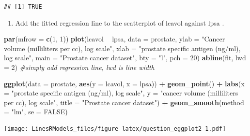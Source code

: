 \documentclass[]{book}
\newenvironment{Shaded}{\begin{snugshade}}{\end{snugshade}}
\newcommand{\KeywordTok}[1]{\textcolor[rgb]{0.13,0.29,0.53}{\textbf{#1}}}
\newcommand{\DataTypeTok}[1]{\textcolor[rgb]{0.13,0.29,0.53}{#1}}
\newcommand{\DecValTok}[1]{\textcolor[rgb]{0.00,0.00,0.81}{#1}}
\newcommand{\StringTok}[1]{\textcolor[rgb]{0.31,0.60,0.02}{#1}}
\newcommand{\CommentTok}[1]{\textcolor[rgb]{0.56,0.35,0.01}{\textit{#1}}}
\newcommand{\OtherTok}[1]{\textcolor[rgb]{0.56,0.35,0.01}{#1}}
\newcommand{\OperatorTok}[1]{\textcolor[rgb]{0.81,0.36,0.00}{\textbf{#1}}}
\newcommand{\NormalTok}[1]{#1}
\providecommand{\tightlist}{%
  \setlength{\itemsep}{0pt}\setlength{\parskip}{0pt}}
\theoremstyle{definition}
\theoremstyle{definition}
\theoremstyle{definition}
\theoremstyle{remark}
\begin{document}
\begin{verbatim}
## [1] TRUE
\end{verbatim}

\begin{enumerate}
\def\labelenumi{\alph{enumi}.}
\setcounter{enumi}{5}
\tightlist
\item
  Add the fitted regression line to the scatterplot of lcavol against
  lpsa .
\end{enumerate}

\begin{Shaded}
\begin{Highlighting}[]
\KeywordTok{par}\NormalTok{(}\DataTypeTok{mfrow =} \KeywordTok{c}\NormalTok{(}\DecValTok{1}\NormalTok{, }\DecValTok{1}\NormalTok{))}
\KeywordTok{plot}\NormalTok{(lcavol }\OperatorTok{~}\StringTok{ }\NormalTok{lpsa, }\DataTypeTok{data =}\NormalTok{ prostate,}
  \DataTypeTok{ylab =} \StringTok{"Cancer volume (milliliters per cc), log scale"}\NormalTok{,}
  \DataTypeTok{xlab =} \StringTok{"prostate specific antigen (ng/ml), log scale"}\NormalTok{, }
  \DataTypeTok{main =} \StringTok{"Prostate cancer dataset"}\NormalTok{,}
  \DataTypeTok{bty =} \StringTok{"l"}\NormalTok{, }\DataTypeTok{pch =} \DecValTok{20}\NormalTok{)}
\KeywordTok{abline}\NormalTok{(fit, }\DataTypeTok{lwd =} \DecValTok{2}\NormalTok{) }\CommentTok{#simply add regression line, lwd is line width}
\end{Highlighting}
\end{Shaded}

\begin{Shaded}
\begin{Highlighting}[]
\KeywordTok{ggplot}\NormalTok{(}\DataTypeTok{data =}\NormalTok{ prostate, }\KeywordTok{aes}\NormalTok{(}\DataTypeTok{y =}\NormalTok{ lcavol, }\DataTypeTok{x =}\NormalTok{ lpsa)) }\OperatorTok{+}\StringTok{ }
\StringTok{  }\KeywordTok{geom_point}\NormalTok{() }\OperatorTok{+}
\StringTok{  }\KeywordTok{labs}\NormalTok{(}\DataTypeTok{x =} \StringTok{"prostate specific antigen (ng/ml), log scale"}\NormalTok{,}
       \DataTypeTok{y =} \StringTok{"cancer volume (milliliters per cc), log scale"}\NormalTok{,}
       \DataTypeTok{title =} \StringTok{"Prostate cancer dataset"}\NormalTok{) }\OperatorTok{+}\StringTok{ }
\StringTok{  }\KeywordTok{geom_smooth}\NormalTok{(}\DataTypeTok{method =} \StringTok{"lm"}\NormalTok{, }\DataTypeTok{se =} \OtherTok{FALSE}\NormalTok{)}
\end{Highlighting}
\end{Shaded}

\texttt{[image: LinesRModels\_files/figure-latex/question\_eggplot2-1.pdf]}
\end{document}
